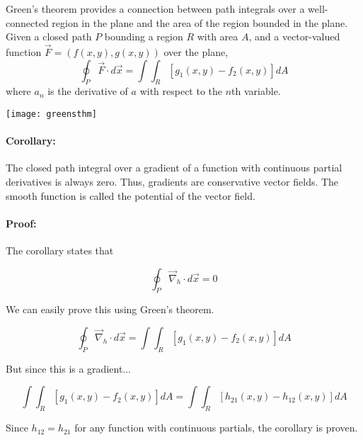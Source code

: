 \documentclass{article}
\begin{document}
Green's theorem provides a connection between path integrals over a well-connected region in the plane and the area of the region bounded in the plane. Given a closed path $P$ bounding a region $R$ with area $A$, and a vector-valued function $\vec{F}=(f(x,y),g(x,y))$ over the plane,
$$\oint_P\vec{F}\cdot d\vec{x} = \int\!\!\!\int_{\!\!R} [g_1(x,y) - f_2(x,y)] dA$$
where $a_n$ is the derivative of $a$ with respect to the $n$th variable.
\begin{center}
\texttt{[image: greensthm]}
\end{center}

\paragraph{Corollary:}

The closed path integral over a gradient of a function with continuous partial derivatives is always zero. Thus, gradients are conservative vector fields. The smooth function is called the potential of the vector field.

\paragraph{Proof:}

The corollary states that

$$\oint_P\vec{\nabla}_h\cdot d\vec{x} = 0$$

We can easily prove this using Green's theorem.

$$\oint_P\vec{\nabla}_h\cdot d\vec{x} = \int\!\!\!\int_{\!\!R} [g_1(x,y) - f_2(x,y)] dA$$

But since this is a gradient...

$$\int\!\!\!\int_{\!\!R} [g_1(x,y) - f_2(x,y)] dA = \int\!\!\!\int_{\!\!R} [h_{21}(x,y) - h_{12}(x,y)] dA$$

Since $h_{12}=h_{21}$ for any function with continuous partials, the corollary is proven.
\end{document}
